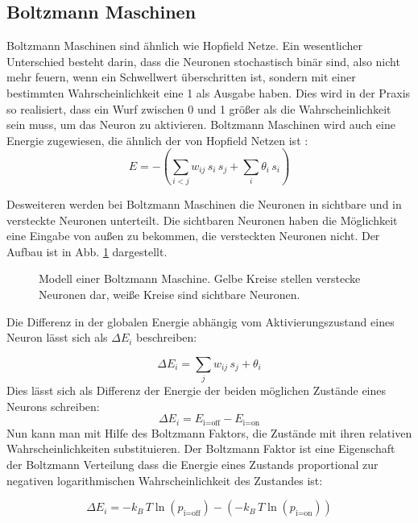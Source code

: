 \documentclass[12pt]{article}
\begin{document}
\subsection{Boltzmann Maschinen}	
Boltzmann Maschinen sind ähnlich wie Hopfield Netze. Ein wesentlicher Unterschied besteht darin, dass die Neuronen stochastisch binär sind, also nicht mehr feuern, wenn ein Schwellwert überschritten ist, sondern mit einer bestimmten Wahrscheinlichkeit eine 1 als Ausgabe haben. Dies wird in der Praxis so realisiert, dass ein Wurf zwischen 0 und 1 größer als die Wahrscheinlichkeit sein muss, um das Neuron zu aktivieren. Boltzmann Maschinen wird auch eine Energie zugewiesen, die ähnlich der von Hopfield Netzen ist \cite{BM}:
\begin{equation}
E = -\left(\sum_{i<j} w_{ij} \, s_i \, s_j + \sum_i \theta_i \, s_i \right)
\end{equation}

Desweiteren werden bei Boltzmann Maschinen die Neuronen in sichtbare und in versteckte Neuronen unterteilt. Die sichtbaren Neuronen haben die Möglichkeit eine Eingabe von außen zu bekommen, die versteckten Neuronen nicht. Der Aufbau ist in Abb. \ref{Boltzmannmaschine} dargestellt.

\begin{figure}[H]
	\center
	
	\caption{Modell einer Boltzmann Maschine. Gelbe Kreise stellen verstecke Neuronen dar, weiße Kreise sind sichtbare Neuronen.}
	\label{Boltzmannmaschine}
	\end{figure}
	
Die Differenz in der globalen Energie abhängig vom Aktivierungszustand eines Neuron lässt sich als  $\Delta E_i$ beschreiben:

\begin{equation}
\Delta E_i = \sum_j w_{ij} \, s_j + \theta_i
\end{equation}
 Dies lässt sich als Differenz der Energie der beiden möglichen Zustände eines Neurons schreiben:
 \begin{equation}
 \Delta E_i = E_\text{i=off} - E_\text{i=on}
 \end{equation}
 Nun kann man mit Hilfe des Boltzmann Faktors, die Zustände mit ihren relativen Wahrscheinlichkeiten substituieren. Der Boltzmann Faktor ist eine Eigenschaft der Boltzmann Verteilung dass die Energie eines Zustands proportional zur negativen logarithmischen Wahrscheinlichkeit des Zustandes ist:
 
 \begin{equation}
 \Delta E_i = -k_B\,T\ln(p_\text{i=off}) - (-k_B\,T\ln(p_\text{i=on}))
 \end{equation}
 
\end{document}

